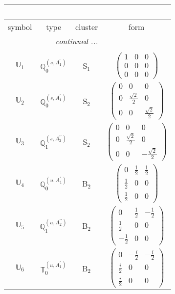 \documentclass[fleqn,10pt,landscape]{article}
\begin{document}
\begin{itemize}
\begin{center}
\begin{longtable}{c|c|c|c}
\multicolumn{3}{l}{\tablename\ \thetable{}} \\
 \hline \hline
symbol & type & cluster & form \\ \hline \endhead

 \hline \hline
\multicolumn{3}{r}{\footnotesize\it continued ...} \\ \endfoot

 \hline \hline
\multicolumn{3}{r}{} \\ \endlastfoot

$ \mathbb{U}_{1} $ & $\mathbb{Q}_{0}^{(s,A_{1}^{\prime})}$ & S$_{1}$ & $\begin{pmatrix} 1 & 0 & 0 \\ 0 & 0 & 0 \\ 0 & 0 & 0 \end{pmatrix}$ \\ \hline
$ \mathbb{U}_{2} $ & $\mathbb{Q}_{0}^{(s,A_{1}^{\prime})}$ & S$_{2}$ & $\begin{pmatrix} 0 & 0 & 0 \\ 0 & \frac{\sqrt{2}}{2} & 0 \\ 0 & 0 & \frac{\sqrt{2}}{2} \end{pmatrix}$ \\
$ \mathbb{U}_{3} $ & $\mathbb{Q}_{1}^{(s,A_{2}^{\prime\prime})}$ & S$_{2}$ & $\begin{pmatrix} 0 & 0 & 0 \\ 0 & \frac{\sqrt{2}}{2} & 0 \\ 0 & 0 & - \frac{\sqrt{2}}{2} \end{pmatrix}$ \\ \hline
$ \mathbb{U}_{4} $ & $\mathbb{Q}_{0}^{(u,A_{1}^{\prime})}$ & B$_{2}$ & $\begin{pmatrix} 0 & \frac{1}{2} & \frac{1}{2} \\ \frac{1}{2} & 0 & 0 \\ \frac{1}{2} & 0 & 0 \end{pmatrix}$ \\
$ \mathbb{U}_{5} $ & $\mathbb{Q}_{1}^{(u,A_{2}^{\prime\prime})}$ & B$_{2}$ & $\begin{pmatrix} 0 & \frac{1}{2} & - \frac{1}{2} \\ \frac{1}{2} & 0 & 0 \\ - \frac{1}{2} & 0 & 0 \end{pmatrix}$ \\
$ \mathbb{U}_{6} $ & $\mathbb{T}_{0}^{(u,A_{1}^{\prime})}$ & B$_{2}$ & $\begin{pmatrix} 0 & - \frac{i}{2} & - \frac{i}{2} \\ \frac{i}{2} & 0 & 0 \\ \frac{i}{2} & 0 & 0 \end{pmatrix}$ \\

\end{longtable}
\end{center}
\end{itemize}
\end{document}
